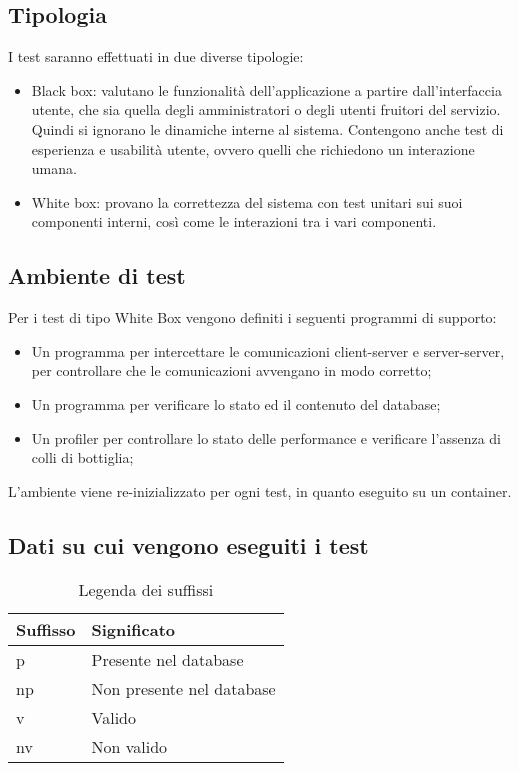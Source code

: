 \subsection{Tipologia}
I test saranno effettuati in due diverse tipologie:
\begin{itemize}
    \item Black box: valutano le funzionalità dell'applicazione a partire dall'interfaccia utente, che
          sia quella degli amministratori o degli utenti fruitori del servizio. Quindi si ignorano le dinamiche
          interne al sistema. Contengono anche test di esperienza e usabilità utente, ovvero quelli che richiedono
          un interazione umana.
    \item White box: provano la correttezza del sistema con test unitari sui suoi componenti interni,
          così come le interazioni tra i vari componenti.
\end{itemize}

\subsection{Ambiente di test}
Per i test di tipo White Box vengono definiti i seguenti programmi di supporto:
\begin{itemize}
    \item Un programma per intercettare le comunicazioni client-server e server-server, per controllare che le
          comunicazioni avvengano in modo corretto;
    \item Un programma per verificare lo stato ed il contenuto del database;
    \item Un profiler per controllare lo stato delle performance e verificare l’assenza di colli di bottiglia;
\end{itemize}
L’ambiente viene re-inizializzato per ogni test, in quanto eseguito su un container.

\subsection{Dati su cui vengono eseguiti i test}

\clearpage
\begin{longtable}{| p{} | p{}  |}
    \caption{Legenda dei suffissi}                                                         \\
    \hline
    \textbf{Suffisso} & \textbf{Significato}                       \\\hline
         p  & Presente nel database                                              \\\hline
        np  & Non presente nel database                                              \\\hline
        v & Valido                          \\\hline
        nv   & Non valido                                          \\\hline
   
\end{longtable}


